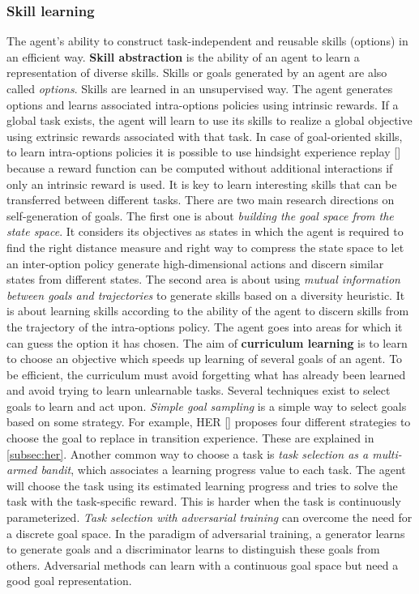 \documentclass[conference]{IEEEtran}
\begin{document}
\subsubsection{Skill learning} \label{subsubsec:skill_learning}
The agent's ability to construct task-independent and reusable skills (options) in an efficient way. \textbf{Skill abstraction} is the ability of an agent to learn a representation of diverse skills. Skills or goals generated by an agent are also called \textit{options}. Skills are learned in an unsupervised way. The agent generates options and learns associated intra-options policies using intrinsic rewards. If a global task exists, the agent will learn to use its skills to realize a global objective using extrinsic rewards associated with that task. In case of goal-oriented skills, to learn intra-options policies it is possible to use hindsight experience replay [\cite{andrychowicz2017hindsight}] because a reward function can be computed without additional interactions if only an intrinsic reward is used. It is key to learn interesting skills that can be transferred between different tasks. There are two main research directions on self-generation of goals. The first one is about \textit{building the goal space from the state space}. It considers its objectives as states in which the agent is required to find the right distance measure and right way to compress the state space to let an inter-option policy generate high-dimensional actions and discern similar states from different states. The second area is about using \textit{mutual information between goals and trajectories} to generate skills based on a diversity heuristic. It is about learning skills according to the ability of the agent to discern skills from the trajectory of the intra-options policy. The agent goes into areas for which it can guess the option it has chosen. The aim of \textbf{curriculum learning} is to learn to choose an objective which speeds up learning of several goals of an agent. To be efficient, the curriculum must avoid forgetting what has already been learned and avoid trying to learn unlearnable tasks. Several techniques exist to select goals to learn and act upon. \textit{Simple goal sampling} is a simple way to select goals based on some strategy. For example, HER [\cite{andrychowicz2017hindsight}] proposes four different strategies to choose the goal to replace in transition experience. These are explained in \ref{subsec:her}. Another common way to choose a task is \textit{task selection as a multi-armed bandit}, which associates a learning progress value to each task. The agent will choose the task using its estimated learning progress and tries to solve the task with the task-specific reward. This is harder when the task is continuously parameterized. \textit{Task selection with adversarial training} can overcome the need for a discrete goal space. In the paradigm of adversarial training, a generator learns to generate goals and a discriminator learns to distinguish these goals from others. Adversarial methods can learn with a continuous goal space but need a good goal representation.
\end{document}
